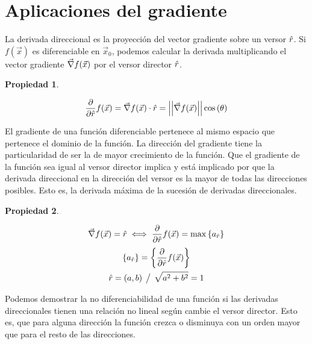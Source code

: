 \documentclass[a5paper,12pt,twoside]{book}
\newtheorem{prop}{{Propiedad}}[chapter]
\begin{document}
\section{Aplicaciones del gradiente}

La derivada direccional es la proyección del vector gradiente sobre un versor $\hat{r}$. Si $f(\Vec{x})$ es diferenciable en $\Vec{x}_0$, podemos calcular la derivada multiplicando el vector gradiente $\Vec{\nabla} f(\Vec{x})$ por el versor director $\hat{r}$.

\begin{mdframed}[style=MyFrame1]
    \begin{prop}
    \end{prop}
    \begin{equation*}
        \frac{\partial}{\partial \hat{r}} f(\Vec{x}) = \Vec{\nabla} f(\Vec{x}) \cdot \hat{r} = {\left|\left| { \Vec{\nabla} f(\Vec{x}) } \right|\right|} \cos{(\theta)}
    \end{equation*}
\end{mdframed}

El gradiente de una función diferenciable pertenece al mismo espacio que pertenece el dominio de la función. La dirección del gradiente tiene la particularidad de ser la de mayor crecimiento de la función. Que el gradiente de la función sea igual al versor director implica y está implicado por que la derivada direccional en la dirección del versor es la mayor de todas las direcciones posibles. Esto es, la derivada máxima de la sucesión de derivadas direccionales.

\begin{mdframed}[style=MyFrame1]
    \begin{prop}
    \end{prop}
    \begin{equation*}
        \Vec{\nabla} f(\Vec{x}) = \hat{r} \iff \frac{\partial}{\partial \hat{r}} f(\Vec{x}) = \operatorname{max} { \left\{ { a_{\hat{r}} } \right\} }
    \end{equation*}
    \begin{gather*}
        { \left\{ { a_{\hat{r}} } \right\} } = { \left\{ { \frac{\partial}{\partial \hat{r}} f(\Vec{x}) } \right\} }
        \\
        \hat{r} = (a,b) \hspace{1ex} \big/ \hspace{1ex} \sqrt{a^2 + b^2}=1
    \end{gather*}
\end{mdframed}

Podemos demostrar la no diferenciabilidad de una función si las derivadas direccionales tienen una relación no lineal según cambie el versor director. Esto es, que para alguna dirección la función crezca o disminuya con un orden mayor que para el resto de las direcciones.
\end{document}
